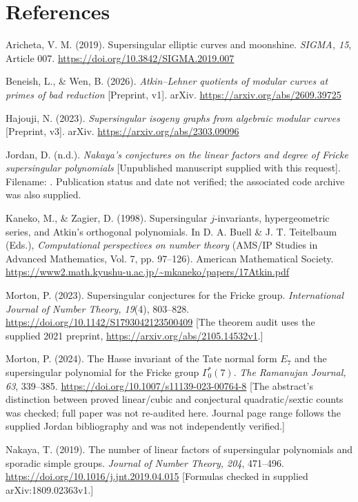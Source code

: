 \documentclass[11pt,a4paper]{article}
\begin{document}
\section*{References}
\footnotesize
\begin{description}
\setlength{\itemsep}{1pt}
\setlength{\parsep}{0pt}
\item Aricheta, V. M. (2019). Supersingular elliptic curves and moonshine. \emph{SIGMA, 15}, Article 007. \url{https://doi.org/10.3842/SIGMA.2019.007}
\item Beneish, L., \& Wen, B. (2026). \emph{Atkin--Lehner quotients of modular curves at primes of bad reduction} [Preprint, v1]. arXiv. \url{https://arxiv.org/abs/2609.39725}
\item Hajouji, N. (2023). \emph{Supersingular isogeny graphs from algebraic modular curves} [Preprint, v3]. arXiv. \url{https://arxiv.org/abs/2303.09096}
\item Jordan, D. (n.d.). \emph{Nakaya's conjectures on the linear factors and degree of Fricke supersingular polynomials} [Unpublished manuscript supplied with this request]. Filename: . Publication status and date not verified; the associated code archive was also supplied.
\item Kaneko, M., \& Zagier, D. (1998). Supersingular $j$-invariants, hypergeometric series, and Atkin's orthogonal polynomials. In D. A. Buell \& J. T. Teitelbaum (Eds.), \emph{Computational perspectives on number theory} (AMS/IP Studies in Advanced Mathematics, Vol. 7, pp. 97--126). American Mathematical Society. \url{https://www2.math.kyushu-u.ac.jp/~mkaneko/papers/17Atkin.pdf}
\item Morton, P. (2023). Supersingular conjectures for the Fricke group. \emph{International Journal of Number Theory, 19}(4), 803--828. \url{https://doi.org/10.1142/S1793042123500409} [The theorem audit uses the supplied 2021 preprint, \url{https://arxiv.org/abs/2105.14532v1}.]
\item Morton, P. (2024). The Hasse invariant of the Tate normal form $E_7$ and the supersingular polynomial for the Fricke group $\Gamma_0^*(7)$. \emph{The Ramanujan Journal, 63}, 339--385. \url{https://doi.org/10.1007/s11139-023-00764-8} [The abstract's distinction between proved linear/cubic and conjectural quadratic/sextic counts was checked; full paper was not re-audited here. Journal page range follows the supplied Jordan bibliography and was not independently verified.]
\item Nakaya, T. (2019). The number of linear factors of supersingular polynomials and sporadic simple groups. \emph{Journal of Number Theory, 204}, 471--496. \url{https://doi.org/10.1016/j.jnt.2019.04.015} [Formulas checked in supplied arXiv:1809.02363v1.]

\end{description}
\end{document}
